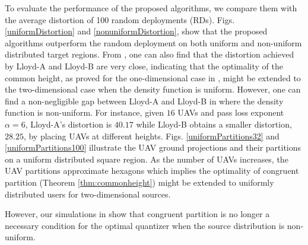 \documentclass[12pt,onecolumn,journal,draftclsnofoot,letterpaper]{IEEEtran}
\newif\ifarxiv\arxivfalse
\begin{document}
To evaluate the performance of the proposed algorithms, we compare them with the average distortion of 100 random
deployments (RDs).  Figs. \ref{uniformDistortion} and \ref{nonuniformDistortion}, show that the proposed algorithms
outperform the random deployment on both uniform and non-uniform distributed target regions.  From
, one can also find that the distortion achieved by Lloyd-A and Lloyd-B are very close,
indicating that the optimality of the common height, as proved for the one-dimensional case in ,
might be extended to the two-dimensional case when the density function is uniform. However, one can find a non-negligible
gap between Lloyd-A and Lloyd-B in  where the density function is non-uniform. For
instance, given $16$ UAVs and pass loss exponent $\alpha=6$, Lloyd-A's distortion is $40.17$ while Lloyd-B obtains a smaller
distortion, $28.25$, by placing UAVs at different heights.  
%
Figs. \ref{uniformPartitions32} and
\ref{uniformPartitions100} illustrate the UAV ground projections and their partitions on a uniform distributed
square region. As the number of UAVs increases, the UAV partitions approximate hexagons which implies the optimality of congruent partition (Theorem \ref{thm:commonheight}) might be extended to uniformly distributed users for two-dimensional sources. 
\ifarxiv However, the UAV projections in Figs. \ref{nonuniformPartitions32} and
\ref{nonuniformPartitions100} show that congruent partition is no longer a necessary condition for the optimal quantizer
when distribution is non-uniform. \else   
However, our
simulations in \cite{GWJ18b} show that congruent partition is no longer a necessary condition for the optimal quantizer
when the source distribution is non-uniform.
\fi
%
\end{document}
